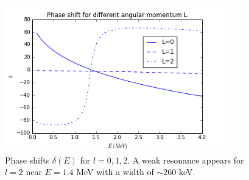 \documentclass[]{scrartcl}
\begin{document}
\begin{figure}
\centering
	\includegraphics[width=0.85\textwidth]{figures/phase.png}
	\caption{Phase shifts $\delta(E)$ for $l=0,1,2$. A weak resonance appears for $l=2$ near $E=1.4$ MeV with a width of $\sim 260$ keV.}
	\label{fig:phase}
\end{figure}

\clearpage




\end{document}

